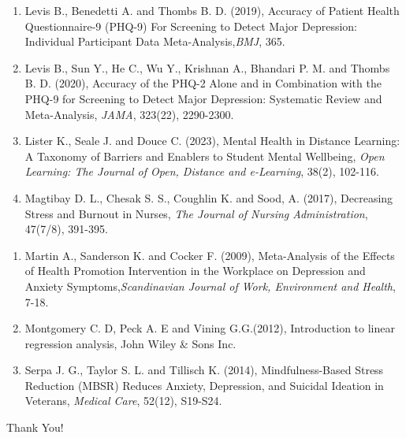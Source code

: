 \documentclass{beamer}
\newcounter{saveenumi}
\newcommand{\seti}{\setcounter{saveenumi}{\value{enumi}}}
\newcommand{\conti}{\setcounter{enumi}{\value{saveenumi}}}
\numberwithin{equation}{section}
\numberwithin{table}{section}
\begin{document}
\begin{frame}
	\begin{enumerate}
		\conti
\item Levis B., Benedetti A. and Thombs B. D. (2019), Accuracy of Patient Health Questionnaire-9 (PHQ-9) For Screening to Detect Major Depression: Individual Participant Data Meta-Analysis,\emph{BMJ}, 365.

\item Levis B., Sun Y., He C., Wu Y., Krishnan A., Bhandari P. M. and Thombs B. D. (2020), Accuracy of the PHQ-2 Alone and in Combination with the PHQ-9 for Screening to Detect Major Depression: Systematic Review and Meta-Analysis,\emph{ JAMA}, 323(22), 2290-2300.

\item Lister K., Seale J. and Douce C. (2023), Mental Health in Distance Learning: A Taxonomy of Barriers and Enablers to Student Mental Wellbeing, \emph{Open Learning: The Journal of Open, Distance and e-Learning}, 38(2), 102-116.

\item Magtibay D. L., Chesak S. S., Coughlin K. and Sood, A. (2017), Decreasing Stress and Burnout in Nurses, \emph{The Journal of Nursing Administration}, 47(7/8), 391-395.

\seti
	\end{enumerate}
\end{frame}
\begin{frame}
	\begin{enumerate}
	\conti
\item Martin A., Sanderson K. and Cocker F. (2009), Meta-Analysis of the Effects of Health Promotion Intervention in the Workplace on Depression and Anxiety Symptoms,\emph{Scandinavian Journal of Work, Environment and Health}, 7-18.
\item  Montgomery C. D, Peck A. E and Vining G.G.(2012), Introduction to linear regression analysis, John Wiley \& Sons Inc.
\item Serpa J. G., Taylor S. L. and Tillisch K. (2014), Mindfulness-Based Stress Reduction (MBSR) Reduces Anxiety, Depression, and Suicidal Ideation in Veterans, \emph{Medical Care}, 52(12), S19-S24.
	\end{enumerate}
\end{frame}
\begin{frame}
	\begin{center}
		{\fontsize{40}{50}\selectfont Thank You!}
	\end{center}
	
\end{frame}
\end{document}
